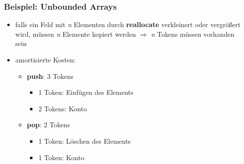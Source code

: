 \documentclass[18pt]{beamer}
\begin{document}
\begin{frame}
	\frametitle{Beispiel: Unbounded Arrays}

	\begin{itemize}
		\item falls ein Feld mit \textit{n} Elementen durch \textbf{reallocate} verkleinert oder vergrößert wird,
		 müssen \textit{n} Elemente kopiert werden $\Rightarrow$ \textit{n} Tokens müssen vorhanden sein
		\item amortisierte Kosten:
		\begin{itemize}
			\item \textbf{push}: 3 Tokens
			\begin{itemize}
				\item 1 Token: Einfügen des Elements
				\item 2 Tokens: Konto
			\end{itemize}
			\item \textbf{pop}: 2 Tokens
			\begin{itemize}
				\item 1 Token: Löschen des Elements
				\item 1 Token: Konto
			\end{itemize}
		\end{itemize}
	\end{itemize}

\end{frame}
\end{document}
